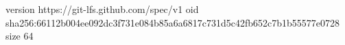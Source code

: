 version https://git-lfs.github.com/spec/v1
oid sha256:66112b004ee092dc3f731e084b85a6a6817c731d5c42fb652c7b1b55577e0728
size 64
